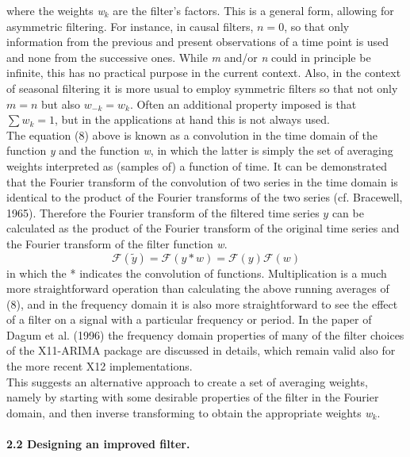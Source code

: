 \documentclass{article}
\begin{document}
where the weights \textit{w$_k$} are the filter’s factors. This is a general form, allowing for asymmetric filtering. For instance, in causal filters, $n=0$, so that only information from the previous and present observations of a time point is used and none from the successive ones. While \textit{m} and/or \textit{n} could in principle be infinite, this has no practical purpose in the current context. Also, in the context of seasonal filtering it is more usual to employ symmetric filters so that not only $m=n$ but also $w_{-k} = w_k$. Often an additional property imposed is that $\sum w_k = 1$, but in the applications at hand this is not always used. \\ The equation (8) above is known as a convolution in the time domain of the function \textit{y} and the function \textit{w}, in which the latter is simply the set of averaging weights interpreted as (samples of) a function of time. It can be demonstrated that the Fourier transform of the convolution of two series in the time domain is identical to the product of the Fourier transforms of the two series (cf. Bracewell, 1965). Therefore the Fourier transform of the filtered time series $\textit{\~ y}$ can be calculated as the product of the Fourier transform of the original time series and the Fourier transform of the filter function \textit{w}.
\begin{equation}
\mathcal{F}(\tilde {y}) = \mathcal{F}(y * w) = \mathcal{F}(y)\mathcal{F}(w)
\end{equation}
in which the * indicates the convolution of functions. Multiplication is a much more straightforward operation than calculating the above running averages of (8), and in the frequency domain it is also more straightforward to see the effect of a filter on a signal with a particular frequency or period. In the paper of Dagum et al. (1996) the frequency domain properties of many of the filter choices of the X11-ARIMA package are discussed in details, which remain valid also for the more recent X12 implementations.\\ This suggests an alternative approach to create a set of averaging weights, namely by starting with some desirable properties of the filter in the Fourier domain, and then inverse transforming to obtain the appropriate weights \textit{w$_k$}.\\
\bigskip\\
\textbf{\small 2.2 Designing an improved filter.}
\end{document}
